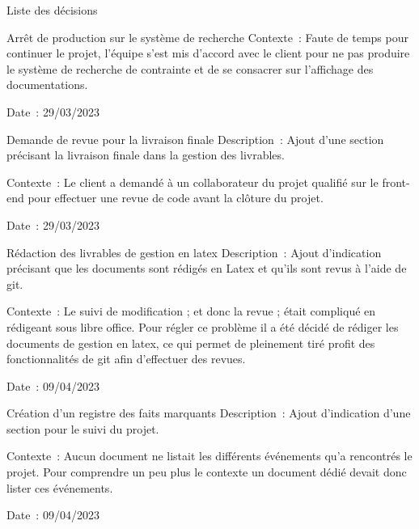 \documentclass[]{article}
\begin{document}
{\begin{section}{Liste des décisions}
\begin{subsection}{Arrêt de production sur le système de recherche}
     Contexte : Faute de temps pour continuer le projet, l’équipe s’est mis d’accord avec le client pour ne pas produire le système de recherche de contrainte et de se consacrer sur l’affichage des documentations.

     Date : 29/03/2023
 \end{subsection}
 \newpage
 \begin{subsection}{Demande de revue pour la livraison finale}
     Description : Ajout d’une section précisant la livraison finale dans la gestion des livrables.

     Contexte : Le client a demandé à un collaborateur du projet qualifié sur le front-end pour effectuer une revue de code avant la clôture du projet.

     Date : 29/03/2023
 \end{subsection}

 \begin{subsection}{Rédaction des livrables de gestion en latex}
    Description : Ajout d'indication précisant que les documents sont rédigés en Latex et qu'ils sont revus à l'aide de git.

    Contexte : Le suivi de modification ; et donc la revue ; était compliqué en rédigeant sous libre office. Pour régler ce problème il a été décidé de rédiger les documents de gestion en latex, ce qui permet de pleinement tiré profit des fonctionnalités de git afin d'effectuer des revues.

    Date : 09/04/2023
\end{subsection}

\begin{subsection}{Création d'un registre des faits marquants}
    Description : Ajout d'indication d'une section pour le suivi du projet.

    Contexte : Aucun document ne listait les différents événements qu'a rencontrés le projet. Pour comprendre un peu plus le contexte un document dédié devait donc lister ces événements.

    Date : 09/04/2023
\end{subsection}
\end{section}
}
\end{document}
